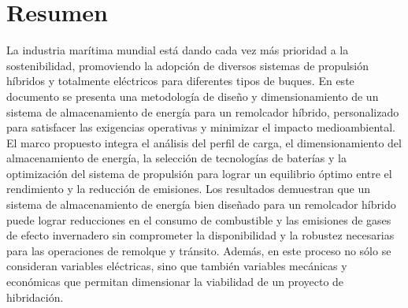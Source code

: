 \chapter{Resumen}
La industria marítima mundial está dando cada vez más prioridad a la sostenibilidad, promoviendo la adopción de diversos sistemas de propulsión híbridos y totalmente eléctricos para diferentes tipos de buques. En este documento se presenta una metodología de diseño y dimensionamiento de un sistema de almacenamiento de energía para un remolcador híbrido, personalizado para satisfacer las exigencias operativas y minimizar el impacto medioambiental. El marco propuesto integra el análisis del perfil de carga, el dimensionamiento del almacenamiento de energía, la selección de tecnologías de baterías y la optimización del sistema de propulsión para lograr un equilibrio óptimo entre el rendimiento y la reducción de emisiones. Los resultados demuestran que un sistema de almacenamiento de energía bien diseñado para un remolcador híbrido puede lograr reducciones en el consumo de combustible y las emisiones de gases de efecto invernadero sin comprometer la disponibilidad y la robustez necesarias para las operaciones de remolque y tránsito. Además, en este proceso no sólo se consideran variables eléctricas, sino que también variables mecánicas y económicas que permitan dimensionar la viabilidad de un proyecto de hibridación.



